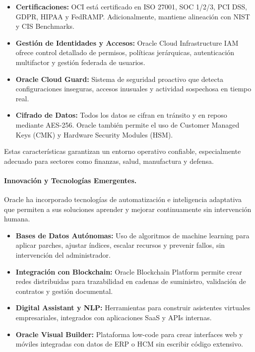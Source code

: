 {                \begin{itemize}
                    \item \textbf{Certificaciones:} OCI está certificado en ISO 27001, SOC 1/2/3, PCI DSS, GDPR, HIPAA y FedRAMP. Adicionalmente, mantiene alineación con NIST y CIS Benchmarks.
                    \item \textbf{Gestión de Identidades y Accesos:} Oracle Cloud Infrastructure IAM ofrece control detallado de permisos, políticas jerárquicas, autenticación multifactor y gestión federada de usuarios.
                    \item \textbf{Oracle Cloud Guard:} Sistema de seguridad proactivo que detecta configuraciones inseguras, accesos inusuales y actividad sospechosa en tiempo real.
                    \item \textbf{Cifrado de Datos:} Todos los datos se cifran en tránsito y en reposo mediante AES-256. Oracle también permite el uso de Customer Managed Keys (CMK) y Hardware Security Modules (HSM).
                \end{itemize}
                
                Estas características garantizan un entorno operativo confiable, especialmente adecuado para sectores como finanzas, salud, manufactura y defensa.
                
                \paragraph{Innovación y Tecnologías Emergentes.}
                Oracle ha incorporado tecnologías de automatización e inteligencia adaptativa que permiten a sus soluciones aprender y mejorar continuamente sin intervención humana.
                
                \begin{itemize}
                    \item \textbf{Bases de Datos Autónomas:} Uso de algoritmos de machine learning para aplicar parches, ajustar índices, escalar recursos y prevenir fallos, sin intervención del administrador.
                    \item \textbf{Integración con Blockchain:} Oracle Blockchain Platform permite crear redes distribuidas para trazabilidad en cadenas de suministro, validación de contratos y gestión documental.
                    \item \textbf{Digital Assistant y NLP:} Herramientas para construir asistentes virtuales empresariales, integrados con aplicaciones SaaS y APIs internas.
                    \item \textbf{Oracle Visual Builder:} Plataforma low-code para crear interfaces web y móviles integradas con datos de ERP o HCM sin escribir código extensivo.
                \end{itemize}
                
}
